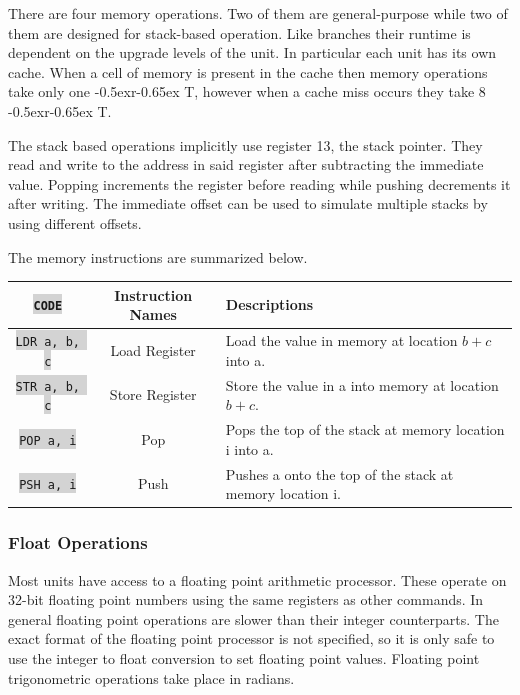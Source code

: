 \documentclass{article}
\newcommand{\vnscode}[1]{\colorbox{lightgray}{\lstinline[language=vns]{#1}}}
\newcommand{\RT}{\lower-0.5ex\hbox{r}\kern-0.65ex T}
\begin{document}
There are four memory operations. Two of them are general-purpose while two of
them are designed for stack-based operation. Like branches their runtime is
dependent on the upgrade levels of the unit. In particular each unit has its own
cache. When a cell of memory is present in the cache then memory operations take
only one \RT, however when a cache miss occurs they take 8 \RT.

The stack based operations implicitly use register 13, the stack pointer. They
read and write to the address in said register after subtracting the immediate
value. Popping increments the register before reading while pushing decrements
it after writing. The immediate offset can be used to simulate multiple stacks
by using different offsets.

The memory instructions are summarized below.

\begin{minipage}{\textwidth}
\label{table:memory}
\centering
\begin{tabular}{|c|c|l|}
    \hline \vnscode{CODE} & Instruction Names & Descriptions \\ \hline
    \vnscode{LDR a, b, c} & Load Register & Load the value in memory at location $b+c$ into a. \\ \hline
    \vnscode{STR a, b, c} & Store Register & Store the value in a into memory at location $b+c$. \\ \hline
    \vnscode{POP a, i} & Pop & Pops the top of the stack at memory location i into a. \\ \hline
    \vnscode{PSH a, i} & Push & Pushes a onto the top of the stack at memory location i. \\ \hline
\end{tabular}
\end{minipage}

\subsubsection{Float Operations}

Most units have access to a floating point arithmetic processor. These operate
on 32-bit floating point numbers using the same registers as other commands. In
general floating point operations are slower than their integer counterparts.
The exact format of the floating point processor is not specified, so it is only
safe to use the integer to float conversion to set floating point values.
Floating point trigonometric operations take place in radians.
\end{document}
